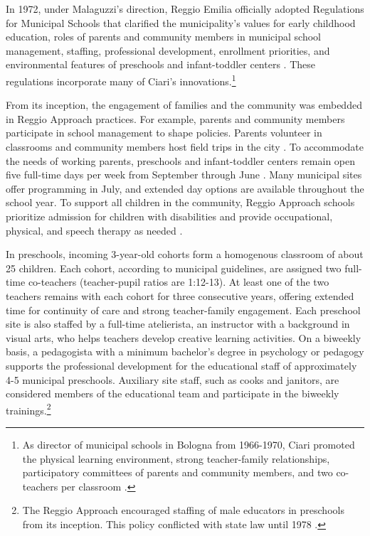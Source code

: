 In 1972, under Malaguzzi's direction, Reggio Emilia officially adopted Regulations for Municipal Schools that clarified the municipality's values for early childhood education, roles of parents and community members in municipal school management, staffing, professional development, enrollment priorities, and environmental features of preschools and infant-toddler centers \citep{Giaroni_1972_Regulations-Municipal-EC-Schools}. These regulations incorporate many of Ciari's innovations.\footnote{As director of municipal schools in Bologna from 1966-1970, Ciari promoted the physical learning environment, strong teacher-family relationships, participatory committees of parents and community members, and two co-teachers per classroom \citep{Edwards-etal-eds_1998_Hundred-Languages}.} 

From its inception, the engagement of families and the community was embedded in Reggio Approach practices. For example, parents and community members participate in school management to shape policies. Parents volunteer in classrooms and community members host field trips in the city \citep{CEHD_2016_Historical-Analysis,Cagliari-etal-eds_2016_BOOK_Loris-Malaguzzi}. To accommodate the needs of working parents, preschools and infant-toddler centers remain open five full-time days per week from September through June \citep{Giudici-Nicolosi_2014_Reggio-Approach}. Many municipal sites offer programming in July, and extended day options are available throughout the school year. To support all children in the community, Reggio Approach schools prioritize admission for children with disabilities and provide occupational, physical, and speech therapy as needed \citep{Edwards-etal-eds_1998_Hundred-Languages,Giaroni_1972_Regulations-Municipal-EC-Schools}.

In preschools, incoming 3-year-old cohorts form a homogenous classroom of about 25 children. Each cohort, according to municipal guidelines, are assigned two full-time co-teachers (teacher-pupil ratios are 1:12-13). At least one of the two teachers remains with each cohort for three consecutive years, offering extended time for continuity of care and strong teacher-family engagement. Each preschool site is also staffed by a full-time atelierista, an instructor with a background in visual arts, who helps teachers develop creative learning activities. On a biweekly basis, a pedagogista with a minimum bachelor's degree in psychology or pedagogy supports the professional development for the educational staff of approximately 4-5 municipal preschools. Auxiliary site staff, such as cooks and janitors, are considered members of the educational team and participate in the biweekly trainings.\footnote{The Reggio Approach encouraged staffing of male educators in preschools from its inception. This policy conflicted with state law until 1978 \citep{Hohnerlein_2015_Development-and-Diffusion}.}

